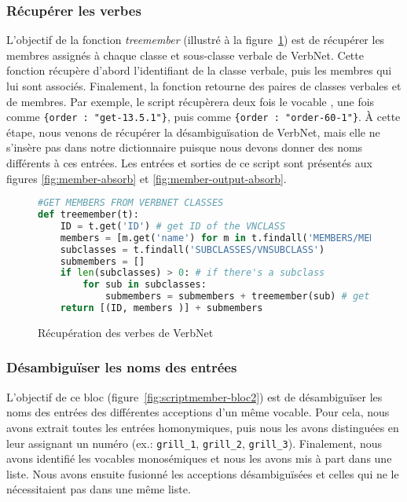\subsubsection{Récupérer les verbes}
L'objectif de la fonction \emph{treemember} (illustré à la figure~\ref{fig:scriptmember-bloc1}) est de récupérer les membres assignés à chaque classe et sous-classe verbale de VerbNet. Cette fonction récupère d'abord l'identifiant de la classe verbale, puis les membres qui lui sont associés. Finalement, la fonction retourne des paires de classes verbales et de membres. Par exemple, le script récupèrera deux fois le vocable , une fois comme \lstinline|{order : "get-13.5.1"}|, puis comme \lstinline|{order : "order-60-1"}|. À cette étape, nous venons de récupérer la désambiguïsation de VerbNet, mais elle ne s'insère pas dans notre dictionnaire puisque nous devons donner des noms différents à ces entrées. Les entrées et sorties de ce script sont présentés aux figures \ref{fig:member-absorb} et \ref{fig:member-output-absorb}.

\begin{figure}[htb]
  \caption{Récupération des verbes de VerbNet}
	\label{fig:scriptmember-bloc1}
\begin{lstlisting}[language=Python]
#GET MEMBERS FROM VERBNET CLASSES
def treemember(t):
    ID = t.get('ID') # get ID of the VNCLASS
    members = [m.get('name') for m in t.findall('MEMBERS/MEMBER')] # get members 
    subclasses = t.findall('SUBCLASSES/VNSUBCLASS')
    submembers = []
    if len(subclasses) > 0: # if there's a subclass
        for sub in subclasses:
            submembers = submembers + treemember(sub) # get ID of the subclass and members
    return [(ID, members )] + submembers
\end{lstlisting}
\end{figure}

\subsubsection{Désambiguïser les noms des entrées}

L'objectif de ce bloc (figure~\ref{fig:scriptmember-bloc2}) est de désambiguïser les noms des entrées des différentes acceptions d'un même vocable. Pour cela, nous avons extrait toutes les entrées homonymiques, puis nous les avons distinguées en leur assignant un numéro (ex.: \texttt{grill\_1}, \texttt{grill\_2}, \texttt{grill\_3}). Finalement, nous avons identifié les vocables monosémiques et nous les avons mis à part dans une liste. Nous avons ensuite fusionné les acceptions désambiguïsées et celles qui ne le nécessitaient pas dans une même liste.

